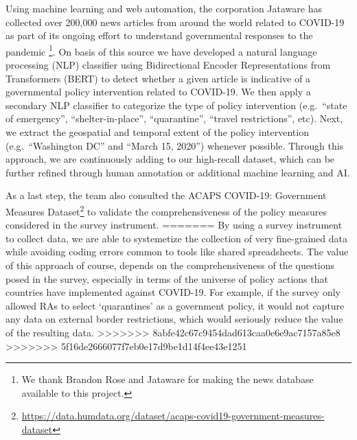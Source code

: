\documentclass[]{article}
\let\rmarkdownfootnote\footnote%
\def\footnote{\protect\rmarkdownfootnote}
\begin{document}
Using machine learning and web automation, the corporation Jataware has collected over 200,000 news articles from around the world related to COVID-19 as part of its ongoing effort to understand governmental responses to the pandemic \footnote{We thank Brandon Rose and Jataware for making the news database available to this project.}. On basis of this source we have developed a natural language processing (NLP) classifier using Bidirectional Encoder Representations from Transformers (BERT) to detect whether a given article is indicative of a governmental policy intervention related to COVID-19. We then apply a secondary NLP classifier to categorize the type of policy intervention (e.g.~``state of emergency'', ``shelter-in-place'', ``quarantine'', ``travel restrictions'', etc). Next, we extract the geospatial and temporal extent of the policy intervention (e.g.~``Washington DC'' and ``March 15, 2020'') whenever possible. Through this approach, we are continuously adding to our high-recall dataset, which can be further refined through human annotation or additional machine learning and AI.

As a last step, the team also consulted the ACAPS COVID-19: Government Measures Dataset\footnote{\url{https://data.humdata.org/dataset/acaps-covid19-government-measures-dataset}} to validate the comprehensiveness of the policy measures considered in the survey instrument.
=======
By using a survey instrument to collect data, we are able to systemetize the collection of very fine-grained data while avoiding coding errors common to tools like shared spreadsheets. The value of this approach of course, depends on the comprehensiveness of the questions posed in the survey, especially in terms of the universe of policy actions that countries have implemented against COVID-19. For example, if the survey only allowed RAs to select `quarantines' as a government policy, it would not capture any data on external border restrictions, which would seriously reduce the value of the resulting data.
>>>>>>> 8abfe42c67c9454dad613caa0e6e9ac7157a85e8
>>>>>>> 5f16de2666077f7eb0e17d9be1d14f4ee43e1251
\end{document}
